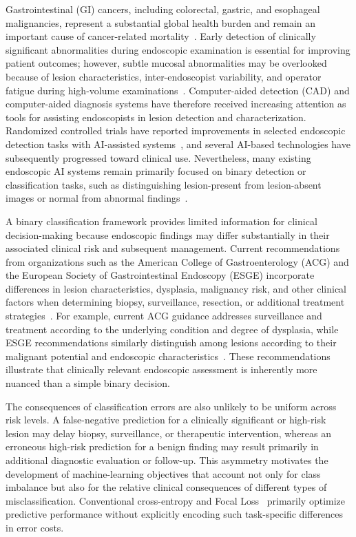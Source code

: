 \documentclass[11pt,a4paper]{article}
\begin{document}
Gastrointestinal (GI) cancers, including colorectal, gastric, and esophageal malignancies, represent a substantial global health burden and remain an important cause of cancer-related mortality~\citep{Sung2021}. Early detection of clinically significant abnormalities during endoscopic examination is essential for improving patient outcomes; however, subtle mucosal abnormalities may be overlooked because of lesion characteristics, inter-endoscopist variability, and operator fatigue during high-volume examinations~\citep{Kaminski2017}. Computer-aided detection (CAD) and computer-aided diagnosis systems have therefore received increasing attention as tools for assisting endoscopists in lesion detection and characterization. Randomized controlled trials have reported improvements in selected endoscopic detection tasks with AI-assisted systems~\citep{Wang2019}, and several AI-based technologies have subsequently progressed toward clinical use. Nevertheless, many existing endoscopic AI systems remain primarily focused on binary detection or classification tasks, such as distinguishing lesion-present from lesion-absent images or normal from abnormal findings~\citep{Ahmad2021}.

A binary classification framework provides limited information for clinical decision-making because endoscopic findings may differ substantially in their associated clinical risk and subsequent management. Current recommendations from organizations such as the American College of Gastroenterology (ACG) and the European Society of Gastrointestinal Endoscopy (ESGE) incorporate differences in lesion characteristics, dysplasia, malignancy risk, and other clinical factors when determining biopsy, surveillance, resection, or additional treatment strategies~\citep{Shaukat2021,Ferlitsch2017}. For example, current ACG guidance addresses surveillance and treatment according to the underlying condition and degree of dysplasia, while ESGE recommendations similarly distinguish among lesions according to their malignant potential and endoscopic characteristics~\citep{Ferlitsch2017}. These recommendations illustrate that clinically relevant endoscopic assessment is inherently more nuanced than a simple binary decision.

The consequences of classification errors are also unlikely to be uniform across risk levels. A false-negative prediction for a clinically significant or high-risk lesion may delay biopsy, surveillance, or therapeutic intervention, whereas an erroneous high-risk prediction for a benign finding may result primarily in additional diagnostic evaluation or follow-up. This asymmetry motivates the development of machine-learning objectives that account not only for class imbalance but also for the relative clinical consequences of different types of misclassification. Conventional cross-entropy and Focal Loss~\citep{Lin2017} primarily optimize predictive performance without explicitly encoding such task-specific differences in error costs.
\end{document}
